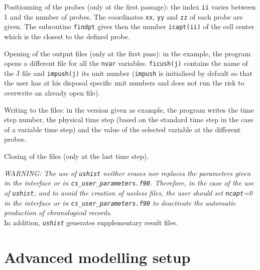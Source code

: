 {{\begin{list}{-}{}
\item Positionning of the probes (only at the first passage): the index
      \texttt{ii} varies between 1 and the number of probes. The coordinates
      \texttt{xx}, \texttt{yy} and \texttt{zz} of each probe are given.
      The subroutine \texttt{findpt}
      gives then the number \texttt{icapt(ii)} of the cell center
      which is the closest to the defined probe.

\item Opening of the output files (only at the first pass): in the
      example, the program opens a different file for
      all the \texttt{nvar} variables. \texttt{ficush(j)} contains the name of the
      J\raisebox{1ex}{\small th} file and \texttt{impush(j)} its unit number
      (\texttt{impush} is initialised by default so that the user has at his
      disposal specific unit numbers and does not run the risk to overwrite an
      already open file).

\item Writing to the files: in the version given as example, the program
      writes the time step number, the physical time step (based on the
      standard time step in the case of a variable time step) and the
      value of the selected variable at the different probes.

\item Closing of the files (only at the last time step).

\end{list}

{\em WARNING: The use of {\em\texttt{ushist}} neither erases nor replaces the
parameters given in the interface or in {\em\texttt{cs\_user\_parameters.f90}}. Therefore, in
the case of the use of {\em\texttt{ushist}}, and to avoid the creation
of useless files, the user should set {\em \texttt{ncapt}=0} in the interface or
in {\em \texttt{cs\_user\_parameters.f90}} to deactivate the automatic production of
chronological records}.\\
In addition, {\em \texttt{ushist}} generates supplementary result
files.


\section{Advanced modelling setup}

}}
